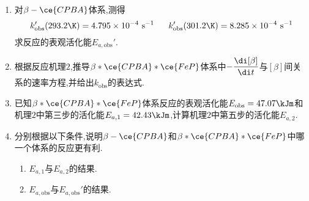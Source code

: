 \documentclass{ctexart}
\begin{document}
\begin{problem}
\begin{table}[H]
\begin{tabular}{|c|c|c|c|}
        \end{tabular}
    \end{table}\vspace{-15pt}
    \begin{enumerate}[label=\tbf{\arabic{Pcounter}-\arabic*},topsep=0pt,parsep=0pt,itemsep=0pt,partopsep=0pt]
        \item 对$\beta-\ce{CPBA}$体系,测得
            \[k_{\text{obs}}'(293.2\K)=4.795\times10^{-4}\text{ s}^{-1}\ \ \ \ \ k_{\text{obs}}'(301.2\K)=8.285\times10^{-4}\text{ s}^{-1}\]
            求反应的表观活化能$E_{a,\text{obs}}'$.
        \item 根据反应机理$2$,推导$\beta\ast\ce{CPBA}\ast\ce{FeP}$体系中$-\dfrac{\di[\beta]}{\di t}$与$[\beta]$间关系的速率方程,并给出$k_{\text{obs}}$的表达式.
        \item 已知$\beta\ast\ce{CPBA}\ast\ce{FeP}$体系反应的表观活化能$E_{\text{obs}}=47.07\kJm$和机理$2$中第三步的活化能$E_{a,1}=42.43\kJm$,计算机理$2$中第五步的活化能$E_{a,2}$.
        \item 分别根据以下条件,说明$\beta-\ce{CPBA}$和$\beta\ast\ce{CPBA}\ast\ce{FeP}$中哪一个体系的反应更有利.
            \begin{enumerate}[label=\tbf{\arabic{Pcounter}-4-\arabic*},topsep=0pt,parsep=0pt,itemsep=0pt,partopsep=0pt,leftmargin=10pt]
                \item $E_{a,1}$与$E_{a,2}$的结果.
                \item $E_{a,\text{obs}}$与$E_{a,\text{obs}}'$的结果.
            \end{enumerate}
    \end{enumerate}
\end{problem}
\end{document}
